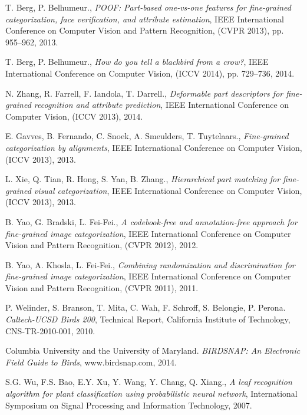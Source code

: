 \documentclass{article}
\begin{document}
\begin{thebibliography}{100}



T. Berg, P. Belhumeur., \emph{POOF: Part-based one-vs-one features for fine-grained categorization, face verification, and attribute estimation}, IEEE International Conference on Computer Vision and Pattern Recognition, (CVPR 2013), pp. 955--962, 2013. 

T. Berg, P. Belhumeur., \emph{How do you tell a blackbird from a crow?}, IEEE International Conference on Computer Vision, (ICCV 2014), pp. 729--736, 2014. 

N. Zhang, R. Farrell, F. Iandola, T. Darrell., \emph{Deformable part descriptors for fine-grained recognition and attribute prediction}, IEEE International Conference on Computer Vision, (ICCV 2013), 2014. 

E. Gavves, B. Fernando, C. Snoek, A. Smeulders, T. Tuytelaars., \emph{Fine-grained categorization by alignments}, IEEE International Conference on Computer Vision, (ICCV 2013), 2013. 

L. Xie, Q. Tian, R. Hong, S. Yan, B. Zhang., \emph{Hierarchical part matching for fine-grained visual categorization}, IEEE International Conference on Computer Vision, (ICCV 2013), 2013. 

B. Yao, G. Bradski, L. Fei-Fei., \emph{A codebook-free and annotation-free approach for fine-grained image categorization}, IEEE International Conference on Computer Vision and Pattern Recognition, (CVPR 2012), 2012. 

B. Yao, A. Khosla, L. Fei-Fei., \emph{Combining randomization and discrimination for fine-grained image categorization}, IEEE International Conference on Computer Vision and Pattern Recognition, (CVPR 2011), 2011. 

P. Welinder, S. Branson, T. Mita, C. Wah, F. Schroff, S. Belongie, P. Perona. \emph{Caltech-UCSD Birds 200}, Technical Report, California Institute of Technology, CNS-TR-2010-001, 2010. 

Columbia University and the University of Maryland. \emph{BIRDSNAP: An Electronic Field Guide to Birds}, www.birdsnap.com, 2014. 

S.G. Wu, F.S. Bao, E.Y. Xu, Y. Wang, Y. Chang, Q. Xiang., \emph{A leaf recognition algorithm for plant classification using probabilistic neural network}, International Symposium on Signal Processing and Information Technology, 2007. 


\end{thebibliography}
\end{document}
